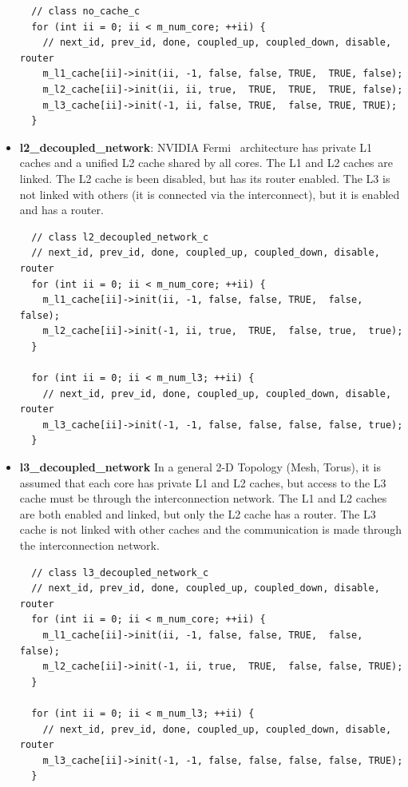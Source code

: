 \begin{itemize}
  \begin{Verbatim}
  // class no_cache_c
  for (int ii = 0; ii < m_num_core; ++ii) {
    // next_id, prev_id, done, coupled_up, coupled_down, disable, router
    m_l1_cache[ii]->init(ii, -1, false, false, TRUE,  TRUE, false);
    m_l2_cache[ii]->init(ii, ii, true,  TRUE,  TRUE,  TRUE, false);
    m_l3_cache[ii]->init(-1, ii, false, TRUE,  false, TRUE, TRUE);
  }
  \end{Verbatim}

  \item \textbf{l2\_decoupled\_network}: NVIDIA Fermi~\cite{fermi} architecture has private L1 caches and a
  unified L2 cache shared by all cores. The L1 and L2 caches are linked. The L2
  cache is been disabled, but has its router enabled. The L3 is not linked with
  others (it is connected via the interconnect), but it is enabled and has a
  router.

  \begin{Verbatim}
  // class l2_decoupled_network_c
  // next_id, prev_id, done, coupled_up, coupled_down, disable, router
  for (int ii = 0; ii < m_num_core; ++ii) {
    m_l1_cache[ii]->init(ii, -1, false, false, TRUE,  false, false);
    m_l2_cache[ii]->init(-1, ii, true,  TRUE,  false, true,  true);
  }

  for (int ii = 0; ii < m_num_l3; ++ii) {
    // next_id, prev_id, done, coupled_up, coupled_down, disable, router
    m_l3_cache[ii]->init(-1, -1, false, false, false, false, true);
  }
  \end{Verbatim}
  
  \item \textbf{l3\_decoupled\_network} In a general 2-D Topology (Mesh, Torus), 
  it is assumed that each core has private L1 and L2 caches, but access to 
  the L3 cache must be through the interconnection network. The L1 and L2 caches 
  are both enabled and linked, but only the L2 cache has a router. The L3 cache is not linked
  with other caches and the communication is made through the interconnection
  network.

  \begin{Verbatim}
  // class l3_decoupled_network_c
  // next_id, prev_id, done, coupled_up, coupled_down, disable, router
  for (int ii = 0; ii < m_num_core; ++ii) {
    m_l1_cache[ii]->init(ii, -1, false, false, TRUE,  false, false);
    m_l2_cache[ii]->init(-1, ii, true,  TRUE,  false, false, TRUE);
  }

  for (int ii = 0; ii < m_num_l3; ++ii) {
    // next_id, prev_id, done, coupled_up, coupled_down, disable, router
    m_l3_cache[ii]->init(-1, -1, false, false, false, false, TRUE);
  }
  \end{Verbatim}
\end{itemize}


